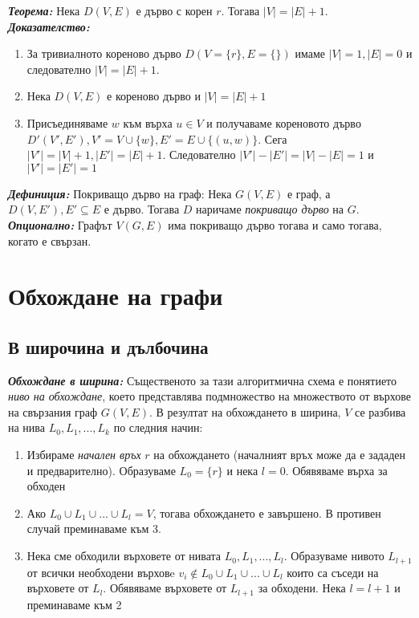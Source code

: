 \documentclass[11pt]{article} %
\newcommand{\italicBold}[1]{\textbf{\emph{#1}}}
\newcommand{\definition}{\italicBold{Дефиниция: }}
\newcommand{\theorem}{\italicBold{Теорема: }}
\newcommand{\proof}{\italicBold{Доказателство: }}
\newcommand{\curlies}[1]{\{#1\}}
\newcommand{\enumNum}{\renewcommand{\theenumi}{\arabic{enumi}}}
\newcommand{\enumlet}{\renewcommand{\theenumi}{\alph{enumi}}}
\begin{document}
\theorem Нека $D(V, E)$ е дърво с корен $r$. Тогава $|V|= |E| + 1$. \\
\proof \\

\enumlet
\begin{enumerate}
	\item За тривиалното кореново дърво $D(V = \curlies{r}, E = \curlies{})$ имаме $|V| = 1, |E| = 0$ и следователно $|V| = |E| + 1$.\\
	\item Нека $D(V, E)$ е кореново дърво и $|V| = |E|+1$\\
	\item Присъединяваме $w$ към върха $u \in V$ и получаваме кореновото дърво $D'(V', E'), V' = V \cup \curlies{w}, E' = E \cup \curlies{(u, w)}$. Сега $|V'| = |V| + 1, |E'| = |E| + 1$. Следователно $|V'| - |E'| = |V| - |E| = 1$ и $|V'| = |E'| = 1$ \\
\end{enumerate} \par

\definition Покриващо дърво на граф: Нека $G(V, E)$ е граф, а \\$D(V, E'), E' \subseteq E$ е дърво. Тогава $D$ наричаме \textit{покриващо дърво} на $G$. \\
\italicBold{Опционално:} Графът $V(G, E)$ има покриващо дърво тогава и само тогава, когато е свързан. 

\section{Обхождане на графи}

\subsection{В широчина и дълбочина}

\italicBold{Обхождане в ширина:} Същественото за тази алгоритмична схема е понятието \textit{ниво на обхождане}, което представлява подмножество на множеството от върхове на свързания граф $G(V, E)$. В резултат на обхождането в ширина, $V$ се разбива на нива $L_{0}, L_{1}, ..., L_{k}$ по следния начин:

\enumNum
\begin{enumerate}
	\item Избираме \textit{начален връх} $r$ на обхождането (началният връх може да е зададен и предварително). Образуваме $L_{0} = \curlies{r}$ и нека $l = 0$. Обявяваме върха за обходен \\
	\item Ако $L_{0} \cup L_{1} \cup ... \cup L_{l} = V$, тогава обхождането е завършено. В противен случай преминаваме към 3. \\
	\item Нека сме обходили върховете от нивата $L_{0}, L_{1}, ..., L_{l}$. Образуваме нивото $L_{l+1}$ от всички необходени върховe $v_{i} \not\in L_{0} \cup L_{1} \cup ... \cup L_{l}$ които са съседи на върховете от $L_{l}$. Обявяваме върховете от $L_{l+1}$ за обходени. Нека $l = l+1$ и преминаваме към 2 
\end{enumerate} \par
\end{document}
